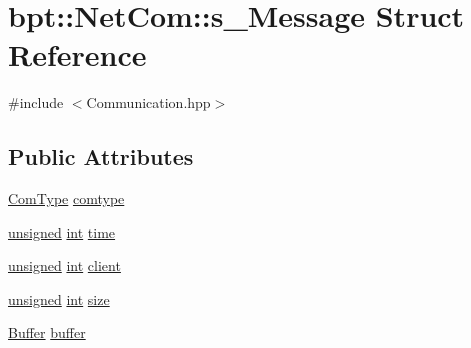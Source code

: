 \hypertarget{structbpt_1_1_net_com_1_1s___message}{\section{bpt\-:\-:Net\-Com\-:\-:s\-\_\-\-Message Struct Reference}
\label{structbpt_1_1_net_com_1_1s___message}
}


{\ttfamily \#include $<$Communication.\-hpp$>$}

\subsection*{Public Attributes}
\begin{DoxyCompactItemize}
\item 
\hyperlink{namespacebpt_1_1_net_com_a73b47b2b099bf7d28997dc72c921212c}{Com\-Type} \hyperlink{structbpt_1_1_net_com_1_1s___message_a16a24f73d103362639eb756c5b04480e}{comtype}
\item 
\hyperlink{curses_8priv_8h_aca40206900cfc164654362fa8d4ad1e6}{unsigned} \hyperlink{term__entry_8h_ad65b480f8c8270356b45a9890f6499ae}{int} \hyperlink{structbpt_1_1_net_com_1_1s___message_ad4ab6e4957dcdaaa9f37f4f66b0ad068}{time}
\item 
\hyperlink{curses_8priv_8h_aca40206900cfc164654362fa8d4ad1e6}{unsigned} \hyperlink{term__entry_8h_ad65b480f8c8270356b45a9890f6499ae}{int} \hyperlink{structbpt_1_1_net_com_1_1s___message_aec720a3ac0621344dccf8752816f890c}{client}
\item 
\hyperlink{curses_8priv_8h_aca40206900cfc164654362fa8d4ad1e6}{unsigned} \hyperlink{term__entry_8h_ad65b480f8c8270356b45a9890f6499ae}{int} \hyperlink{structbpt_1_1_net_com_1_1s___message_a9058566f13a6dd0eee9836ff08d56ad1}{size}
\item 
\hyperlink{namespacebpt_1_1_net_com_ab30a61348361333a522ae21fb65fdbd0}{Buffer} \hyperlink{structbpt_1_1_net_com_1_1s___message_ab43cc1b8b6de27fb50d847f951d12262}{buffer}
\end{DoxyCompactItemize}



